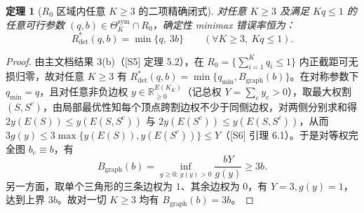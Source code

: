 \documentclass[11pt,a4paper]{article}
\newtheorem{theorem}{定理}[section]
\theoremstyle{definition}
\theoremstyle{remark}
\newcommand{\Rdet}{R^*_{\mathrm{det}}}
\newcommand{\Bg}{B_{\mathrm{graph}}}
\newcommand{\Thetasym}{\Theta^{\mathrm{sym}}_K}
\begin{document}
\begin{theorem}[$R_0$ 区域内任意 $K \ge 3$ 的二项精确闭式]\label{thm:R0}
对任意 $K \ge 3$ 及满足 $Kq \le 1$ 的任意可行参数 $(q, b) \in \Thetasym \cap R_0$，确定性 minimax 错误率恒为：
\begin{equation}\label{eq:R0_closed}
  \boxed{\Rdet(q, b) = \min\{q,\ 3b\} \qquad (\forall K \ge 3,\ Kq \le 1).}
\end{equation}
\end{theorem}
\begin{proof}
由主文档结果 3(b)（[S5] 定理 5.2），在 $R_0 = \{\sum_{i=1}^K q_i \le 1\}$ 内正截距可无损归零，故对任意 $K \ge 3$ 有 $\Rdet(q, b) = \min\{q_{\min}, \Bg(b)\}$。在对称参数下 $q_{\min} = q$，且对任意非负边权 $y \in \mathbb{R}_{\ge 0}^{E(K_K)}$（记总权 $Y = \sum_e y_e > 0$），取最大权割 $(S, S^c)$，由局部最优性知每个顶点跨割边权不少于同侧边权，对两侧分别求和得 $2y(E(S)) \le y(E(S, S^c))$ 与 $2y(E(S^c)) \le y(E(S, S^c))$，从而 $3g(y) \le 3\max\{y(E(S)), y(E(S^c))\} \le Y$（[S6] 引理 6.1）。于是对等权完全图 $b_e \equiv b$，有
\[
  \Bg(b) = \inf_{y \ge 0:\, g(y) > 0} \frac{b Y}{g(y)} \ge 3b.
\]
另一方面，取单个三角形的三条边权为 $1$、其余边权为 $0$，有 $Y = 3, g(y) = 1$，达到上界 $3b$。故对一切 $K \ge 3$ 均有 $\Bg(b) = 3b$。
\end{proof}
\end{document}
